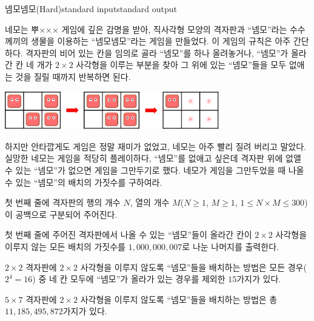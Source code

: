 \begin{problem}{넴모넴모(Hard)}{standard input}{standard output}

네모는 뿌××× 게임에 깊은 감명을 받아, 직사각형 모양의 격자판과 ``넴모''라는 수수께끼의 생물을 이용하는 ``넴모넴모''라는 게임을 만들었다. 이 게임의 규칙은 아주 간단하다. 격자판의 비어 있는 칸을 임의로 골라 ``넴모''를 하나 올려놓거나, ``넴모''가 올라간 칸 네 개가 $2 \times 2$ 사각형을 이루는 부분을 찾아 그 위에 있는 ``넴모''들을 모두 없애는 것을 질릴 때까지 반복하면 된다.

\begin{center}
  \includegraphics[width=0.7\textwidth]{nemo.png}
\end{center}

하지만 안타깝게도 게임은 정말 재미가 없었고, 네모는 아주 빨리 질려 버리고 말았다. 실망한 네모는 게임을 적당히 플레이하다, ``넴모''를 없애고 싶은데 격자판 위에 없앨 수 있는 ``넴모''가 없으면 게임을 그만두기로 했다. 네모가 게임을 그만두었을 때 나올 수 있는 ``넴모''의 배치의 가짓수를 구하여라.

\InputFile
첫 번째 줄에 격자판의 행의 개수 $N$, 열의 개수 $M$($N \ge 1$, $M \ge 1$, $1 \le N \times M \le 300$)이 공백으로 구분되어 주어진다.

\OutputFile
첫 번째 줄에 주어진 격자판에서 나올 수 있는 ``넴모''들이 올라간 칸이 $2 \times 2$ 사각형을 이루지 않는 모든 배치의 가짓수를 $1,000,000,007$로 나눈 나머지를 출력한다.

\Example

\begin{example}
%
%
%
\end{example}

\Notes
$2 \times 2$ 격자판에 $2 \times 2$ 사각형을 이루지 않도록 ``넴모''들을 배치하는 방법은 모든 경우($2^{4}=16$) 중 네 칸 모두에 ``넴모''가 올라가 있는 경우를 제외한 $15$가지가 있다.

$5 \times 7$ 격자판에 $2 \times 2$ 사각형을 이루지 않도록 ``넴모''들을 배치하는 방법은 총 $11,185,495,872$가지가 있다.

\end{problem}
